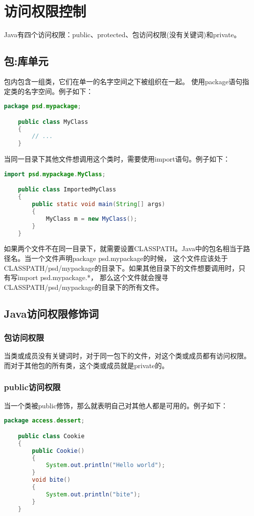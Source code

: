 \documentclass[a4paper,left=2.5cm,right=2.5cm,11pt]{article}
\begin{document}
\clearpage

\section{访问权限控制}
	Java有四个访问权限：public、protected、包访问权限(没有关键词)和private。

\subsection{包:库单元}
	包内包含一组类，它们在单一的名字空间之下被组织在一起。
	使用package语句指定类的名字空间。例子如下：
	\begin{lstlisting}[language = Java]
	package psd.mypackage;

	public class MyClass
	{
		// ...
	}
	\end{lstlisting}

	当同一目录下其他文件想调用这个类时，需要使用import语句。例子如下：
	\begin{lstlisting}[language = Java]
	import psd.mypackage.MyClass;

	public class ImportedMyClass
	{
		public static void main(String[] args)
		{
			MyClass m = new MyClass();
		}
	}
	\end{lstlisting}

	如果两个文件不在同一目录下，就需要设置CLASSPATH。Java中的包名相当于路径名。当一个文件声明package psd.mypackage的时候，
	这个文件应该处于CLASSPATH/psd/mypackage的目录下。如果其他目录下的文件想要调用时，只有写import psd.mypackage.*，
	那么这个文件就会搜寻CLASSPATH/psd/mypackage的目录下的所有文件。

\subsection{Java访问权限修饰词}
\subsubsection{包访问权限}
	当类或成员没有关键词时，对于同一包下的文件，对这个类或成员都有访问权限。
	而对于其他包的所有类，这个类或成员就是private的。

\subsubsection{public访问权限}
	当一个类被public修饰，那么就表明自己对其他人都是可用的。例子如下：
	\begin{lstlisting}[language = Java]
	package access.dessert;

	public class Cookie
	{
		public Cookie()
		{
			System.out.println("Hello world");
		}
		void bite()
		{
			System.out.println("bite");
		}
	}
	\end{lstlisting}
\end{document}
